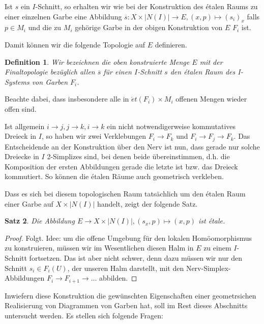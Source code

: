 \documentclass[a4paper]{article}
\newtheorem{satz}{Satz}[section]
\newtheorem{defn}[satz]{Definition}
\newcommand{\et}{\acute{e}t}
\begin{document}
Ist $s$ ein $I$-Schnitt, so erhalten wir wie bei der Konstruktion des
étalen Raums zu einer einzelnen Garbe eine Abbildung $\overline{s}: X
\times |N(I)| \to E, (x, p) \mapsto (s_i)_x$ falls $p \in M_i$ und die
zu $M_i$ gehörige Garbe in der obigen Konstruktion von $E$ $F_i$ ist.

Damit können wir die folgende Topologie auf $E$ definieren.

\begin{defn}
  Wir bezeichnen die oben konstruierte Menge $E$ mit der
  Finaltopologie bezüglich allen $\overline{s}$ für einen $I$-Schnitt
  $s$ den étalen Raum des I-Systems von Garben $F_i$.
\end{defn}

Beachte dabei, dass insbesondere alle in $\et(F_i) \times M_i$ offenen
Mengen wieder offen sind. 

Ist allgemein $i \to j, j \to k, i \to k$ ein nicht notwendigerweise
kommutatives Dreieck in $I$, so haben wir zwei Verklebungen $F_i \to
F_k$ und $F_i \to F_j \to F_k$. Das Entscheidende an der Konstruktion
über den Nerv ist nun, dass gerade nur solche Dreiecke in $I$
2-Simplizes sind, bei denen beide übereinstimmen, d.h. die Komposition
der ersten Abbildungen gerade die letzte ist bzw. das Dreieck
kommutiert. So können die étalen Räume auch geometrisch
verkleben. 

Dass es sich bei diesem topologischen Raum tatsächlich um den étalen
Raum einer Garbe auf $X \times |N(I)|$ handelt, zeigt der folgende
Satz.

\begin{satz}
  Die Abbildung $E \to X \times |N(I)|, (s_x, p) \mapsto (x, p)$ ist
  étale.
\end{satz}

\begin{proof}
  Folgt.  Idee: um die offene Umgebung für den lokalen
  Homöomorphismus zu konstruieren, müssen wir im Wesentlichen diesen
  Halm in $E$ zu einem $I$-Schnitt fortsetzen. Das ist aber nicht
  schwer, denn dazu müssen wir nur den Schnitt $s_i \in F_i(U)$, der
  unseren Halm darstellt, mit den Nerv-Simplex-Abbildungen $F_i \to
  F_{i+1} \to \dots$ abbilden.
\end{proof}

Inwiefern diese Konstruktion die gewünschten Eigenschaften einer
geometrsichen Realisierung von Diagrammen von Garben hat, soll im Rest
dieses Abschnitts untersucht werden. Es stellen sich folgende Fragen:
\end{document}
